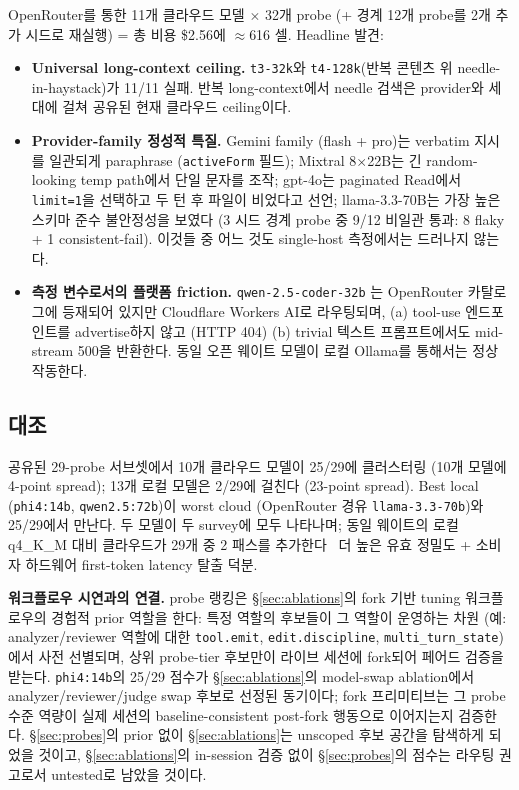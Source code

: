 \documentclass[11pt,a4paper]{article}
\begin{document}
OpenRouter를 통한 11개 클라우드 모델 $\times$ 32개 probe
(+ 경계 12개 probe를 2개 추가 시드로 재실행) = 총 비용 \$2.56에
$\approx$616 셀. Headline 발견:

\begin{itemize}[leftmargin=*,itemsep=2pt,topsep=2pt]
\item \textbf{Universal long-context ceiling.} \texttt{t3-32k}와
      \texttt{t4-128k}(반복 콘텐츠 위 needle-in-haystack)가 11/11 실패.
      반복 long-context에서 needle 검색은 provider와 세대에 걸쳐 공유된
      현재 클라우드 ceiling이다.
\item \textbf{Provider-family 정성적 특질.} Gemini family (flash + pro)는
      verbatim 지시를 일관되게 paraphrase (\texttt{activeForm} 필드);
      Mixtral 8$\times$22B는 긴 random-looking temp path에서 단일 문자를
      조작; gpt-4o는 paginated Read에서 \texttt{limit=1}을 선택하고 두
      턴 후 파일이 비었다고 선언; llama-3.3-70B는 가장 높은 스키마 준수
      불안정성을 보였다 (3 시드 경계 probe 중 9/12 비일관 통과: 8 flaky
      + 1 consistent-fail). 이것들 중 어느 것도 single-host 측정에서는
      드러나지 않는다.
\item \textbf{측정 변수로서의 플랫폼 friction.} \texttt{qwen-2.5-coder-32b}
      는 OpenRouter 카탈로그에 등재되어 있지만 Cloudflare Workers AI로
      라우팅되며, (a) tool-use 엔드포인트를 advertise하지 않고 (HTTP 404)
      (b) trivial 텍스트 프롬프트에서도 mid-stream 500을 반환한다. 동일
      오픈 웨이트 모델이 로컬 Ollama를 통해서는 정상 작동한다.
\end{itemize}

\subsection{대조}

공유된 29-probe 서브셋에서 10개 클라우드 모델이 25/29에
클러스터링 (10개 모델에 4-point spread); 13개 로컬 모델은
2/29에 걸친다 (23-point spread). Best local
(\texttt{phi4:14b}, \texttt{qwen2.5:72b})이 worst cloud
(OpenRouter 경유 \texttt{llama-3.3-70b})와 25/29에서 만난다. 두 모델이
두 survey에 모두 나타나며; 동일 웨이트의 로컬 q4\_K\_M 대비 클라우드가
29개 중 2 패스를 추가한다 \textemdash\ 더 높은 유효 정밀도
+ 소비자 하드웨어 first-token latency 탈출 덕분.

\textbf{워크플로우 시연과의 연결.} probe 랭킹은
\S\ref{sec:ablations}의 fork 기반 tuning 워크플로우의 경험적
prior 역할을 한다: 특정 역할의 후보들이 그 역할이 운영하는
차원 (예: analyzer/reviewer 역할에 대한 \texttt{tool.emit},
\texttt{edit.discipline}, \texttt{multi\_turn\_state})에서 사전
선별되며, 상위 probe-tier 후보만이 라이브 세션에 fork되어
페어드 검증을 받는다. \texttt{phi4:14b}의 25/29 점수가
\S\ref{sec:ablations}의 model-swap ablation에서 analyzer/reviewer/judge
swap 후보로 선정된 동기이다; fork 프리미티브는 그 probe 수준
역량이 실제 세션의 baseline-consistent post-fork 행동으로
이어지는지 검증한다. \S\ref{sec:probes}의 prior 없이
\S\ref{sec:ablations}는 unscoped 후보 공간을 탐색하게 되었을
것이고, \S\ref{sec:ablations}의 in-session 검증 없이
\S\ref{sec:probes}의 점수는 라우팅 권고로서 untested로 남았을
것이다.
\end{document}

